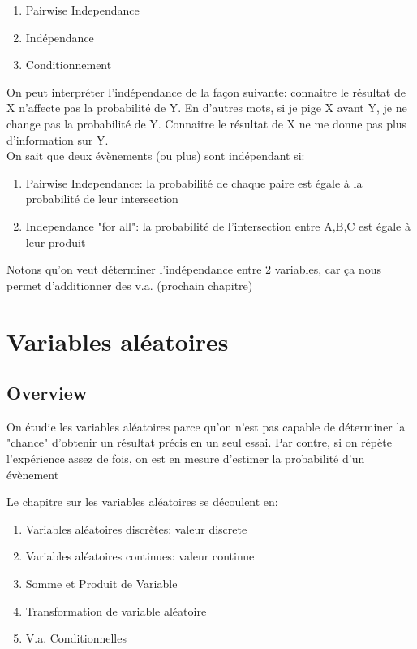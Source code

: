 \documentclass{article}
\begin{document}
\begin{enumerate}
    \item Pairwise Independance
    \item Indépendance
    \item Conditionnement
\end{enumerate}

On peut interpréter l'indépendance de la façon suivante: connaitre
le résultat de X n'affecte pas la probabilité de Y. En d'autres mots,
si je pige X avant Y, je ne change pas la probabilité de Y. Connaitre
le résultat de X ne me donne pas plus d'information sur Y.\\

On sait que deux évènements (ou plus) sont indépendant si:
\begin{enumerate}
    \item Pairwise Independance: la probabilité de chaque paire est
	égale à la probabilité de leur intersection
    \item Independance "for all": la probabilité de l'intersection
	entre A,B,C est égale à leur produit
\end{enumerate}

Notons qu'on veut déterminer l'indépendance entre 2 variables, car ça
nous permet d'additionner des v.a. (prochain chapitre)

\section{Variables aléatoires}

\subsection*{Overview}

On étudie les variables aléatoires parce qu'on n'est pas capable
de déterminer la "chance" d'obtenir un résultat précis en un seul essai.
Par contre, si on répète l'expérience assez de fois, on est en mesure
d'estimer la probabilité d'un évènement

Le chapitre sur les variables aléatoires se découlent en:
\begin{enumerate}
    \item Variables aléatoires discrètes: valeur discrete
    \item Variables aléatoires continues: valeur continue
    \item Somme et Produit de Variable
    \item Transformation de variable aléatoire
    \item V.a. Conditionnelles
\end{enumerate}
\end{document}
